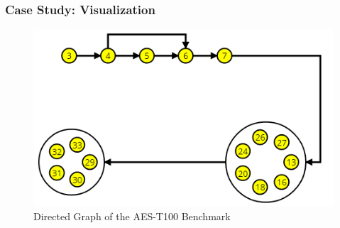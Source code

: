 \documentclass{beamer}
\begin{document}
\begin{frame}
	\frametitle{Case Study: Visualization}
	\begin{figure}
		\centering
		\includegraphics[width=0.7\linewidth]{../Thesis/Figures/aesVisual}
		\caption[Directed Graph of the AES-T100 Benchmark]{Directed Graph of the AES-T100 Benchmark}
		\label{fig:aesVisual}
	\end{figure}
\end{frame}
%
%
%
\end{document}
